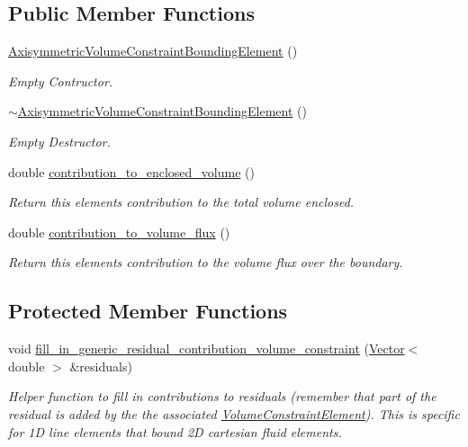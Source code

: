 \subsection*{Public Member Functions}
\begin{DoxyCompactItemize}
\item 
\hyperlink{classoomph_1_1AxisymmetricVolumeConstraintBoundingElement_a716ae91b7c11f6d71c474bec6f6d6d24}{Axisymmetric\+Volume\+Constraint\+Bounding\+Element} ()
\begin{DoxyCompactList}\small\item\em Empty Contructor. \end{DoxyCompactList}\item 
\hyperlink{classoomph_1_1AxisymmetricVolumeConstraintBoundingElement_ac7b98a2915cef69c7e4825e1f5730bc5}{$\sim$\+Axisymmetric\+Volume\+Constraint\+Bounding\+Element} ()
\begin{DoxyCompactList}\small\item\em Empty Destructor. \end{DoxyCompactList}\item 
double \hyperlink{classoomph_1_1AxisymmetricVolumeConstraintBoundingElement_a2d54cd3bce11538b066c8626b241d2c9}{contribution\+\_\+to\+\_\+enclosed\+\_\+volume} ()
\begin{DoxyCompactList}\small\item\em Return this element\textquotesingle{}s contribution to the total volume enclosed. \end{DoxyCompactList}\item 
double \hyperlink{classoomph_1_1AxisymmetricVolumeConstraintBoundingElement_a746f88f325d61610e10e97465fd2ca09}{contribution\+\_\+to\+\_\+volume\+\_\+flux} ()
\begin{DoxyCompactList}\small\item\em Return this element\textquotesingle{}s contribution to the volume flux over the boundary. \end{DoxyCompactList}\end{DoxyCompactItemize}
\subsection*{Protected Member Functions}
\begin{DoxyCompactItemize}
\item 
void \hyperlink{classoomph_1_1AxisymmetricVolumeConstraintBoundingElement_a2a3f3b86079f27d52679f357f5276d91}{fill\+\_\+in\+\_\+generic\+\_\+residual\+\_\+contribution\+\_\+volume\+\_\+constraint} (\hyperlink{classoomph_1_1Vector}{Vector}$<$ double $>$ \&residuals)
\begin{DoxyCompactList}\small\item\em Helper function to fill in contributions to residuals (remember that part of the residual is added by the the associated \hyperlink{classoomph_1_1VolumeConstraintElement}{Volume\+Constraint\+Element}). This is specific for 1D line elements that bound 2D cartesian fluid elements. \end{DoxyCompactList}\end{DoxyCompactItemize}
